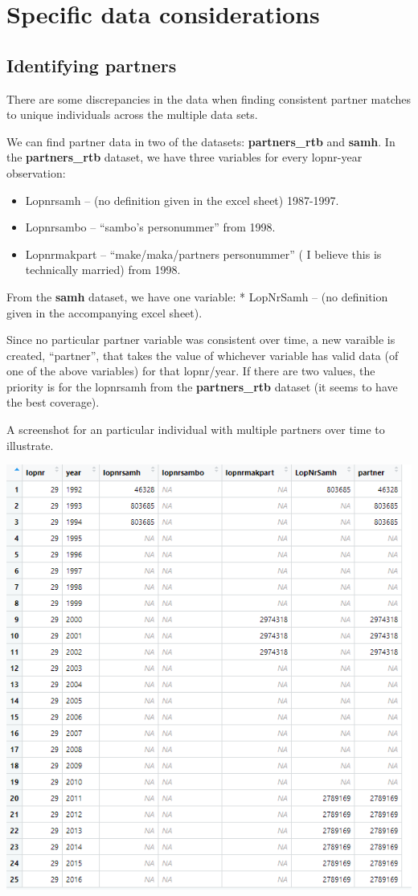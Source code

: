 \documentclass[
]{book}
\providecommand{\tightlist}{%
  \setlength{\itemsep}{0pt}\setlength{\parskip}{0pt}}
\begin{document}
\hypertarget{specific-data-considerations}{%
\section{Specific data considerations}\label{specific-data-considerations}}

\hypertarget{identifying-partners}{%
\subsection{Identifying partners}\label{identifying-partners}}

There are some discrepancies in the data when finding consistent partner matches to unique individuals across the multiple data sets.

We can find partner data in two of the datasets: \textbf{partners\_rtb} and \textbf{samh}. In the \textbf{partners\_rtb} dataset, we have three variables for every lopnr-year observation:

\begin{itemize}
\tightlist
\item
  Lopnrsamh -- (no definition given in the excel sheet) 1987-1997.
\item
  Lopnrsambo -- ``sambo's personummer'' from 1998.
\item
  Lopnrmakpart -- ``make/maka/partners personummer'' ( I believe this is technically married) from 1998.
\end{itemize}

From the \textbf{samh} dataset, we have one variable:
* LopNrSamh -- (no definition given in the accompanying excel sheet).

Since no particular partner variable was consistent over time, a new varaible is created, ``partner'', that takes the value of whichever variable has valid data (of one of the above variables) for that lopnr/year. If there are two values, the priority is for the lopnrsamh from the \textbf{partners\_rtb} dataset (it seems to have the best coverage).

A screenshot for an particular individual with multiple partners over time to illustrate.

\includegraphics[width=0.8\linewidth]{output/figures/partners_png}
\end{document}
